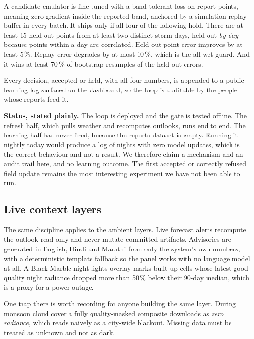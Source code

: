 A candidate emulator is fine-tuned with a band-tolerant loss on report points, meaning zero gradient
inside the reported band, anchored by a simulation replay buffer in every batch. It ships only if
all four of the following hold. There are at least 15 held-out points from at least two distinct
storm days, held out \emph{by day} because points within a day are correlated. Held-out point error
improves by at least 5\,\%. Replay error degrades by at most 10\,\%, which is the all-wet guard. And
it wins at least 70\,\% of bootstrap resamples of the held-out errors.

Every decision, accepted or held, with all four numbers, is appended to a public learning log
surfaced on the dashboard, so the loop is auditable by the people whose reports feed it.

\textbf{Status, stated plainly.} The loop is deployed and the gate is tested offline. The refresh
half, which pulls weather and recomputes outlooks, runs end to end. The learning half has never
fired, because the reports dataset is empty. Running it nightly today would produce a log of nights
with zero model updates, which is the correct behaviour and not a result. We therefore claim a
mechanism and an audit trail here, and no learning outcome. The first accepted or correctly refused
field update remains the most interesting experiment we have not been able to run.

\subsection{Live context layers}
The same discipline applies to the ambient layers. Live forecast alerts recompute the outlook
read-only and never mutate committed artifacts. Advisories are generated in English, Hindi and
Marathi from only the system's own numbers, with a deterministic template fallback so the panel
works with no language model at all. A Black Marble night lights overlay \cite{roman2018} marks
built-up cells whose latest good-quality night radiance dropped more than 50\,\% below their 90-day
median, which is a proxy for a power outage.

One trap there is worth recording for anyone building the same layer. During monsoon cloud cover a
fully quality-masked composite downloads as \emph{zero radiance}, which reads naively as a city-wide
blackout. Missing data must be treated as unknown and not as dark.
